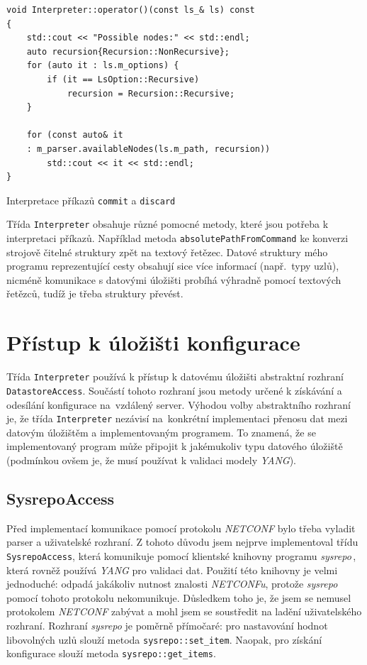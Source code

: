 \documentclass[thesis=B,czech,hidelinks]{FITthesis}[2019/03/06]
\begin{document}
\begin{listing}[H]
\begin{verbatim}
void Interpreter::operator()(const ls_& ls) const
{
    std::cout << "Possible nodes:" << std::endl;
    auto recursion{Recursion::NonRecursive};
    for (auto it : ls.m_options) {
        if (it == LsOption::Recursive)
            recursion = Recursion::Recursive;
    }

    for (const auto& it
    : m_parser.availableNodes(ls.m_path, recursion))
        std::cout << it << std::endl;
}
\end{verbatim}
\caption{Interpretace příkazů \texttt{commit} a \texttt{discard}}\label{interpreter:ls}
\end{listing}


Třída \texttt{Interpreter} obsahuje různé pomocné metody, které jsou potřeba k interpretaci příkazů. Například metoda \texttt{absolutePathFromCommand} ke konverzi strojově čitelné struktury zpět na textový řetězec. Datové struktury mého programu reprezentující cesty obsahují sice více informací (např.\ typy uzlů), nicméně komunikace s datovými úložišti probíhá výhradně pomocí textových řetězců, tudíž je třeba struktury převést.


\section{Přístup k úložišti konfigurace}\label{datastore:access}
Třída \texttt{Interpreter} používá k přístup k datovému úložišti abstraktní rozhraní \texttt{DatastoreAccess}. Součástí tohoto rozhraní jsou metody určené k získávání a odesílání konfigurace na~vzdálený server. Výhodou volby abstraktního rozhraní je, že třída \texttt{Interpreter} nezávisí na~konkrétní implementaci přenosu dat mezi datovým úložištěm a implementovaným programem. To znamená, že se implementovaný program může připojit k jakémukoliv typu datového úložiště (podmínkou ovšem je, že musí používat k validaci modely \textit{YANG}).

\subsection{SysrepoAccess}
Před implementací komunikace pomocí protokolu \textit{NETCONF} bylo třeba vyladit parser a uživatelské rozhraní. Z tohoto důvodu jsem nejprve implementoval třídu \texttt{SysrepoAccess}, která komunikuje pomocí klientské knihovny programu \textit{sysrepo}\,\cite{sysrepo}, která rovněž používá \textit{YANG} pro validaci dat. Použití této knihovny je velmi jednoduché: odpadá jakákoliv nutnost znalosti \textit{NETCONFu}, protože \textit{sysrepo} pomocí tohoto protokolu nekomunikuje. Důsledkem toho je, že jsem se nemusel protokolem \textit{NETCONF} zabývat a mohl jsem se soustředit na ladění uživatelského rozhraní. Rozhraní \textit{sysrepo} je poměrně přímočaré: pro nastavování hodnot libovolných uzlů slouží metoda \texttt{sysrepo::set\_item}. Naopak, pro získání konfigurace slouží metoda \texttt{sysrepo::get\_items}.
\end{document}
